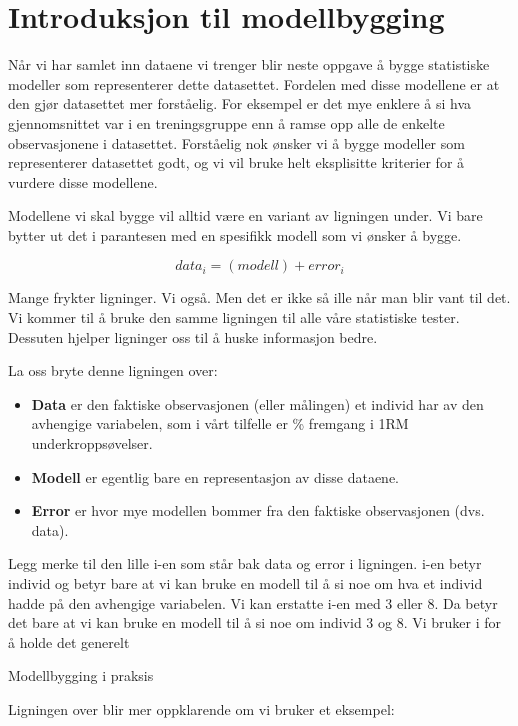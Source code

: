 \documentclass[
]{book}
\begin{document}
\hypertarget{introduksjon-til-modellbygging}{%
\section{Introduksjon til modellbygging}\label{introduksjon-til-modellbygging}}

Når vi har samlet inn dataene vi trenger blir neste oppgave å bygge statistiske modeller som representerer dette datasettet. Fordelen med disse modellene er at den gjør datasettet mer forståelig. For eksempel er det mye enklere å si hva gjennomsnittet var i en treningsgruppe enn å ramse opp alle de enkelte observasjonene i datasettet. Forståelig nok ønsker vi å bygge modeller som representerer datasettet godt, og vi vil bruke helt eksplisitte kriterier for å vurdere disse modellene.

Modellene vi skal bygge vil alltid være en variant av ligningen under. Vi bare bytter ut det i parantesen med en spesifikk modell som vi ønsker å bygge.

\[
data_i = (modell) + error_i
\]

Mange frykter ligninger. Vi også. Men det er ikke så ille når man blir vant til det. Vi kommer til å bruke den samme ligningen til alle våre statistiske tester. Dessuten hjelper ligninger oss til å huske informasjon bedre.

La oss bryte denne ligningen over:

\begin{itemize}
\item
  \textbf{Data} er den faktiske observasjonen (eller målingen) et individ har av den avhengige variabelen, som i vårt tilfelle er \% fremgang i 1RM underkroppsøvelser.
\item
  \textbf{Modell} er egentlig bare en representasjon av disse dataene.
\item
  \textbf{Error} er hvor mye modellen bommer fra den faktiske observasjonen (dvs. data).
\end{itemize}

Legg merke til den lille i-en som står bak data og error i ligningen. i-en betyr individ og betyr bare at vi kan bruke en modell til å si noe om hva et individ hadde på den avhengige variabelen. Vi kan erstatte i-en med 3 eller 8. Da betyr det bare at vi kan bruke en modell til å si noe om individ 3 og 8. Vi bruker i for å holde det generelt

{Modellbygging i praksis}

Ligningen over blir mer oppklarende om vi bruker et eksempel:
\end{document}

